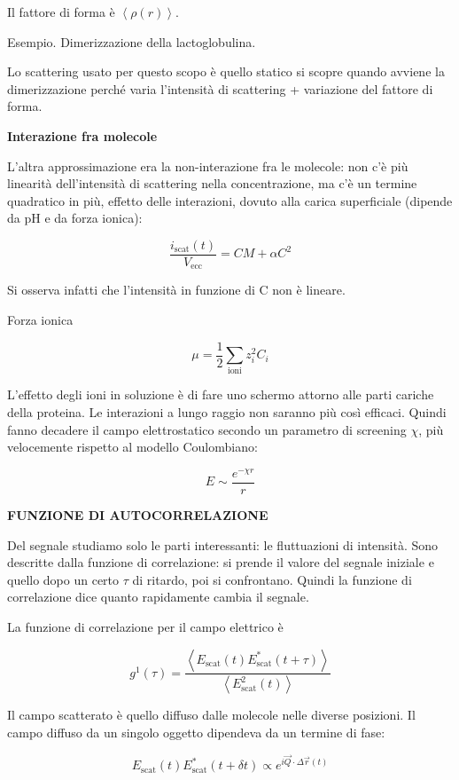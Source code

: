 Il fattore di forma è
\(\left\langle \rho\left( r \right) \right\rangle\).

Esempio. Dimerizzazione della lactoglobulina.

Lo scattering usato per questo scopo è quello statico si scopre quando
avviene la dimerizzazione perché varia l'intensità di scattering +
variazione del fattore di forma.

\textbf{Interazione fra molecole}

L'altra approssimazione era la non-interazione fra le molecole: non c'è
più linearità dell'intensità di scattering nella concentrazione, ma c'è
un termine quadratico in più, effetto delle interazioni, dovuto alla
carica superficiale (dipende da pH e da forza ionica):

\[\frac{i_{\text{scat}}\left( t \right)}{V_{\text{ecc}}} = CM + \alpha C^{2}\]

Si osserva infatti che l'intensità in funzione di C non è lineare.

Forza ionica

\[\mu = \frac{1}{2}\sum_{\text{ioni}}^{}{z_{i}^{2}C_{i}}\]

L'effetto degli ioni in soluzione è di fare uno schermo attorno alle
parti cariche della proteina. Le interazioni a lungo raggio non saranno
più così efficaci. Quindi fanno decadere il campo elettrostatico secondo
un parametro di screening \(\chi\), più velocemente rispetto al modello
Coulombiano:

\[E \sim \frac{e^{- \chi r}}{r}\]

\textbf{FUNZIONE DI AUTOCORRELAZIONE}

Del segnale studiamo solo le parti interessanti: le fluttuazioni di
intensità. Sono descritte dalla funzione di correlazione: si prende il
valore del segnale iniziale e quello dopo un certo \(\tau\) di ritardo,
poi si confrontano. Quindi la funzione di correlazione dice quanto
rapidamente cambia il segnale.

La funzione di correlazione per il campo elettrico è

\[g^{1}\left( \tau \right) = \frac{\left\langle E_{\text{scat}}\left( t \right)E_{\text{scat}}^{*}\left( t + \tau \right) \right\rangle}{\left\langle E_{\text{scat}}^{2}\left( t \right) \right\rangle}\]

Il campo scatterato è quello diffuso dalle molecole nelle diverse
posizioni. Il campo diffuso da un singolo oggetto dipendeva da un
termine di fase:

\[E_{\text{scat}}\left( t \right)E_{\text{scat}}^{*}\left( t + \delta t \right) \propto e^{i\overrightarrow{Q} \cdot \Delta\overrightarrow{r}\left( t \right)}\]

